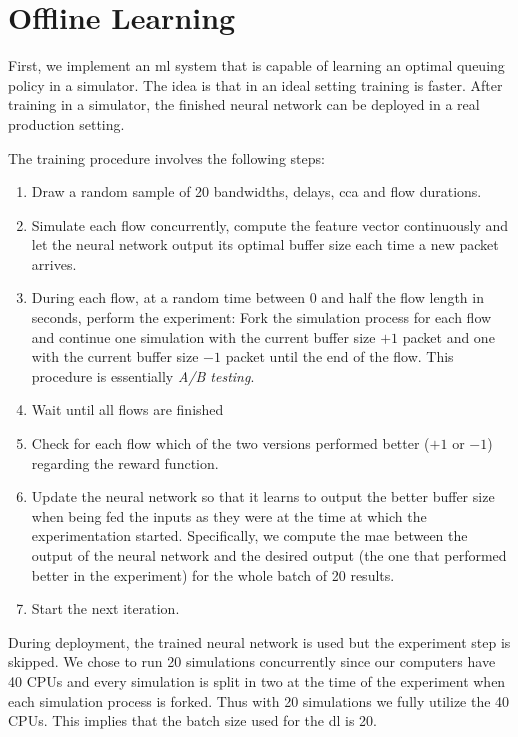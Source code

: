 \documentclass[conference]{IEEEtran}
\begin{document}
\section{Offline Learning}

First, we implement an \gls{ml} system that is capable of learning an optimal queuing policy in a simulator. The idea is that in an ideal setting training is faster. After training in a simulator, the finished neural network can be deployed in a real production setting. 

The training procedure involves the following steps:
\begin{enumerate}
\item Draw a random sample of 20 bandwidths, delays, \gls{cca} and flow durations.
\item Simulate each flow concurrently, compute the feature vector continuously and let the neural network output its optimal buffer size each time a new packet arrives. 
\item During each flow, at a random time between 0 and half the flow length in seconds, perform the experiment: Fork the simulation process for each flow and continue one simulation with the current buffer size $+1$ packet and one with the current buffer size $-1$ packet until the end of the flow. This procedure is essentially \textit{A/B testing}.  
\item Wait until all flows are finished
\item Check for each flow which of the two versions performed better ($+1$ or $-1$) regarding the reward function.
\item Update the neural network so that it learns to output the better buffer size when being fed the inputs as they were at the time at which the experimentation started. Specifically, we compute the \gls{mae} between the output of the neural network and the desired output (the one that performed better in the experiment) for the whole batch of 20 results.
\item Start the next iteration. 
\end{enumerate}

During deployment, the trained neural network is used but the experiment step is skipped. We chose to run 20 simulations concurrently since our computers have 40 CPUs and every simulation is split in two at the time of the experiment when each simulation process is forked. Thus with 20 simulations we fully utilize the 40 CPUs. This implies that the batch size used for the \gls{dl} is 20. 
\end{document}
